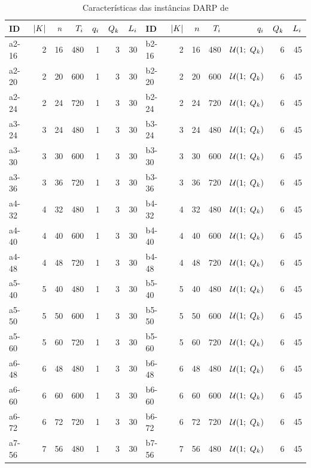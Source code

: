 \begin{table}[h]
\footnotesize
  \centering
  \caption{Características das instâncias DARP de 
           \textcite{ropke_models_2007}}
  \newcommand{\qib}{$\uniformDistribution{1}{\vehicleCapacity}$}
  \label{tab:ropke_models_2007_DARP_instances_caracteristics}
  \begin{tabular}{lrrrrrr|lrrrrrr}
    \toprule
    ID & $|K|$ & $n$ & $T_i$ & 
    $q_i$ & $Q_k$ & $L_i$ & 
    ID & $|K|$ & $n$ & $T_i$ & 
    $q_i$ & $Q_k$ & $L_i$\\
    \midrule
    a2-16 & 2 & 16 & 480 & 1 & 3 & 30 & b2-16 & 2 & 16 & 480 & \qib & 6 & 45\\
    a2-20 & 2 & 20 & 600 & 1 & 3 & 30 & b2-20 & 2 & 20 & 600 & \qib & 6 & 45\\
    a2-24 & 2 & 24 & 720 & 1 & 3 & 30 & b2-24 & 2 & 24 & 720 & \qib & 6 & 45\\
    a3-24 & 3 & 24 & 480 & 1 & 3 & 30 & b3-24 & 3 & 24 & 480 & \qib & 6 & 45\\
    a3-30 & 3 & 30 & 600 & 1 & 3 & 30 & b3-30 & 3 & 30 & 600 & \qib & 6 & 45\\
    a3-36 & 3 & 36 & 720 & 1 & 3 & 30 & b3-36 & 3 & 36 & 720 & \qib & 6 & 45\\
    a4-32 & 4 & 32 & 480 & 1 & 3 & 30 & b4-32 & 4 & 32 & 480 & \qib & 6 & 45\\
    a4-40 & 4 & 40 & 600 & 1 & 3 & 30 & b4-40 & 4 & 40 & 600 & \qib & 6 & 45\\
    a4-48 & 4 & 48 & 720 & 1 & 3 & 30 & b4-48 & 4 & 48 & 720 & \qib & 6 & 45\\
    a5-40 & 5 & 40 & 480 & 1 & 3 & 30 & b5-40 & 5 & 40 & 480 & \qib & 6 & 45\\
    a5-50 & 5 & 50 & 600 & 1 & 3 & 30 & b5-50 & 5 & 50 & 600 & \qib & 6 & 45\\
    a5-60 & 5 & 60 & 720 & 1 & 3 & 30 & b5-60 & 5 & 60 & 720 & \qib & 6 & 45\\
    a6-48 & 6 & 48 & 480 & 1 & 3 & 30 & b6-48 & 6 & 48 & 480 & \qib & 6 & 45\\
    a6-60 & 6 & 60 & 600 & 1 & 3 & 30 & b6-60 & 6 & 60 & 600 & \qib & 6 & 45\\
    a6-72 & 6 & 72 & 720 & 1 & 3 & 30 & b6-72 & 6 & 72 & 720 & \qib & 6 & 45\\
    a7-56 & 7 & 56 & 480 & 1 & 3 & 30 & b7-56 & 7 & 56 & 480 & \qib & 6 & 45\\

\end{tabular}
\end{table}
